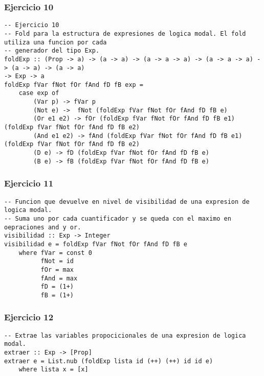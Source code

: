 \vspace{1cm}

\subsubsection*{Ejercicio 10}
\begin{lstlisting}
-- Ejercicio 10
-- Fold para la estructura de expresiones de logica modal. El fold utiliza una funcion por cada
-- generador del tipo Exp.
foldExp :: (Prop -> a) -> (a -> a) -> (a -> a -> a) -> (a -> a -> a) -> (a -> a) -> (a -> a) 
-> Exp -> a
foldExp fVar fNot fOr fAnd fD fB exp =
	case exp of
		(Var p) -> fVar p
		(Not e) ->  fNot (foldExp fVar fNot fOr fAnd fD fB e)
		(Or e1 e2) -> fOr (foldExp fVar fNot fOr fAnd fD fB e1) (foldExp fVar fNot fOr fAnd fD fB e2)
		(And e1 e2) -> fAnd (foldExp fVar fNot fOr fAnd fD fB e1) (foldExp fVar fNot fOr fAnd fD fB e2)
		(D e) -> fD (foldExp fVar fNot fOr fAnd fD fB e)
		(B e) -> fB (foldExp fVar fNot fOr fAnd fD fB e)
\end{lstlisting}
\vspace{1cm}


\subsubsection*{Ejercicio 11}
\begin{lstlisting}
-- Funcion que devuelve en nivel de visibilidad de una expresion de logica modal.
-- Suma uno por cada cuantificador y se queda con el maximo en oepraciones and y or.
visibilidad :: Exp -> Integer
visibilidad e = foldExp fVar fNot fOr fAnd fD fB e
    where fVar = const 0
          fNot = id
          fOr = max
          fAnd = max
          fD = (1+)
          fB = (1+)
\end{lstlisting}
\vspace{1cm}

\subsubsection*{Ejercicio 12}
\begin{lstlisting}
-- Extrae las variables propocicionales de una expresion de logica modal.
extraer :: Exp -> [Prop]
extraer e = List.nub (foldExp lista id (++) (++) id id e)
	where lista x = [x]
\end{lstlisting}
\vspace{1cm}

